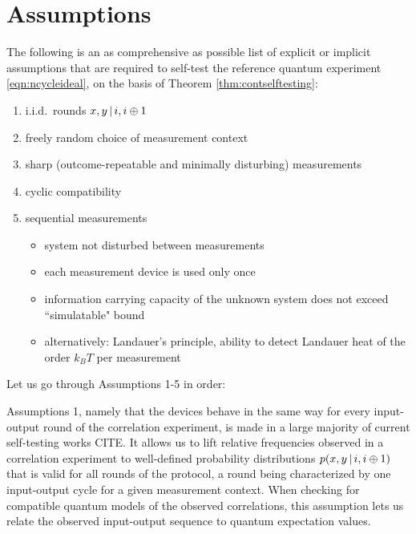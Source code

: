 \section{Assumptions}
\label{sec:kscontass}
The following is an as comprehensive as possible list of explicit or implicit assumptions that are required to self-test the reference quantum experiment \ref{eqn:ncycleideal}, on the basis of Theorem \ref{thm:contselftesting}:
\begin{enumerate}
    \item i.i.d.\ rounds $x,y \thinspace\vert\thinspace i,i\oplus 1$
    \item freely random choice of measurement context
    \item sharp (outcome-repeatable and minimally disturbing) measurements 
    \item cyclic compatibility
    \item sequential measurements
    \begin{itemize}
        \item system not disturbed between measurements
        \item each measurement device is used only once
        \item information carrying capacity of the unknown system does not exceed ``simulatable" bound
        \item alternatively: Landauer's principle, ability to detect Landauer heat of the order $k_B T$ per measurement
    \end{itemize}
\end{enumerate}

Let us go through Assumptions 1-5 in order:

Assumptions 1, namely that the devices behave in the same way for every input-output round of the correlation experiment, is made in a large majority of current self-testing works CITE. It allows us to lift relative frequencies observed in a correlation experiment to well-defined probability distributions $p(x,y\thinspace\vert\thinspace i, i\oplus 1)$ that is valid for all rounds of the protocol, a round being characterized by one input-output cycle for a given measurement context. When checking for compatible quantum models of the observed correlations, this assumption lets us relate the observed input-output sequence to quantum expectation values.

